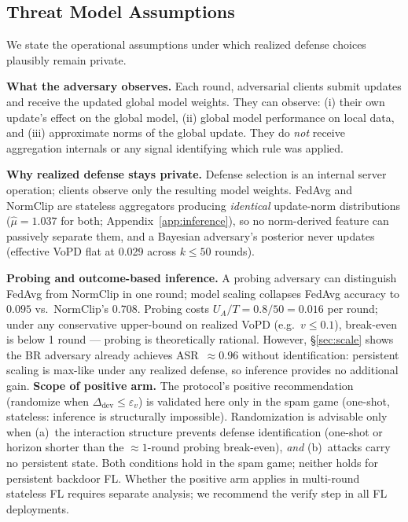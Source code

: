 \documentclass{article}
\begin{document}
\subsection{Threat Model Assumptions}
\label{sec:threat_model}

We state the operational assumptions under which realized defense choices plausibly remain private.

\textbf{What the adversary observes.} Each round, adversarial clients submit updates and receive the updated global model weights. They can observe: (i) their own update's effect on the global model, (ii) global model performance on local data, and (iii) approximate norms of the global update. They do \emph{not} receive aggregation internals or any signal identifying which rule was applied.

\textbf{Why realized defense stays private.} Defense selection is an internal server operation; clients observe only the resulting model weights. FedAvg and NormClip are stateless aggregators producing \emph{identical} update-norm distributions ($\hat{\mu}=1.037$ for both; Appendix~\ref{app:inference}), so no norm-derived feature can passively separate them, and a Bayesian adversary's posterior never updates (effective VoPD flat at 0.029 across $k \leq 50$ rounds).

\textbf{Probing and outcome-based inference.} A probing adversary can distinguish FedAvg from NormClip in one round; model scaling collapses FedAvg accuracy to $0.095$ vs.\ NormClip's $0.708$. Probing costs $U_A/T = 0.8/50 = 0.016$ per round; under any conservative upper-bound on realized VoPD (e.g.\ $v \leq 0.1$), break-even is below 1 round --- probing is theoretically rational. However, §\ref{sec:scale} shows the BR adversary already achieves ASR~$\approx 0.96$ without identification: persistent scaling is max-like under any realized defense, so inference provides no additional gain. \textbf{Scope of positive arm.} The protocol's positive recommendation (randomize when $\Delta_{\mathrm{dev}} \leq \varepsilon_v$) is validated here only in the spam game (one-shot, stateless: inference is structurally impossible). Randomization is advisable only when (a)~the interaction structure prevents defense identification (one-shot or horizon shorter than the ${\approx}1$-round probing break-even), \emph{and} (b)~attacks carry no persistent state. Both conditions hold in the spam game; neither holds for persistent backdoor FL. Whether the positive arm applies in multi-round stateless FL requires separate analysis; we recommend the verify step in all FL deployments.
\end{document}
